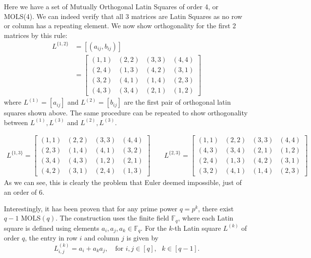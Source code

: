 Here we have a set of Mutually Orthogonal Latin Squares of order 4, or MOLS(4). We can indeed verify that all 3 matrices are Latin Squares as no row or column has a repeating element. We now show orthogonality for the first 2 matrices by this rule:
\begin{align*}
    L^{\{1,2\}} &= [(a_{ij}, b_{ij})]\\
    &= \begin{bmatrix}
        (1,1) & (2,2) & (3,3) & (4,4)\\
        (2,4) & (1,3) & (4,2) & (3,1)\\
        (3,2) & (4,1) & (1,4) & (2,3)\\
        (4,3) & (3,4) & (2,1) & (1,2)
    \end{bmatrix}
\end{align*}
where $L^{(1)}=[a_{ij}]$ and $L^{(2)} = [b_{ij}]$ are the first pair of orthogonal latin squares shown above. The same procedure can be repeated to show orthogonality between $L^{(1)},L^{(3)}$ and $L^{(2)},L^{(3)}$. 

\[
\begin{aligned}
    L^{\{1,3\}} =
    \begin{bmatrix}
        (1,1) & (2,2) & (3,3) & (4,4)\\
        (2,3) & (1,4) & (4,1) & (3,2)\\
        (3,4) & (4,3) & (1,2) & (2,1)\\
        (4,2) & (3,1) & (2,4) & (1,3)
    \end{bmatrix}\quad\quad
    L^{\{2,3\}} =
    \begin{bmatrix}
        (1,1) & (2,2) & (3,3) & (4,4)\\
        (4,3) & (3,4) & (2,1) & (1,2)\\
        (2,4) & (1,3) & (4,2) & (3,1)\\
        (3,2) & (4,1) & (1,4) & (2,3)
    \end{bmatrix}
\end{aligned}
\]As we can see, this is clearly the problem that Euler deemed impossible, just of an order of 6. 

\newpage
Interestingly, it has been proven that for any prime power $q=p^k$, there exist $q-1$ MOLS$(q)$. The construction uses the finite field $\mathbb{F}_q$, where each Latin square is defined using elements $a_i,a_j,a_k\in\mathbb{F}_q$. For the $k$-th Latin square $L^{(k)}$ of order $q$, the entry in row $i$ and column $j$ is given by
\begin{equation*}
    L^{(k)}_{i,j} = a_i+a_ka_j,\quad\text{for }i,j\in[q], \text{ }k\in[q-1].
\end{equation*}


